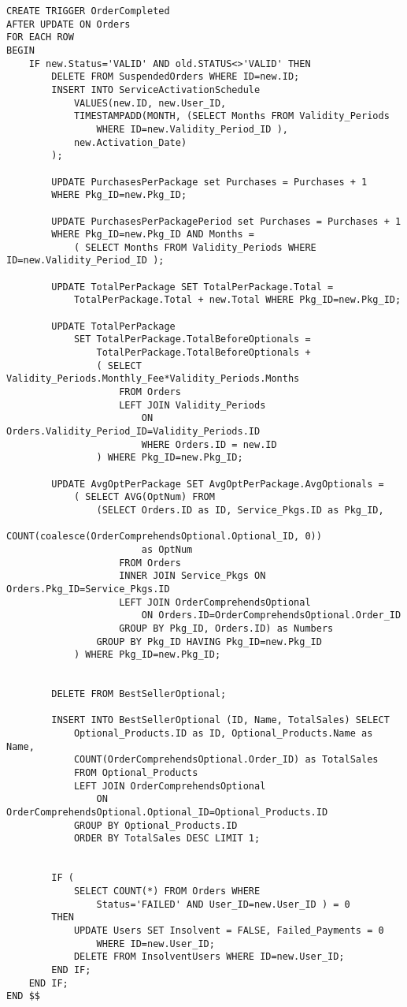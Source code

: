 \begin{lstlisting}[style=SQL]
CREATE TRIGGER OrderCompleted
AFTER UPDATE ON Orders
FOR EACH ROW
BEGIN
    IF new.Status='VALID' AND old.STATUS<>'VALID' THEN
        DELETE FROM SuspendedOrders WHERE ID=new.ID;
        INSERT INTO ServiceActivationSchedule
            VALUES(new.ID, new.User_ID,
            TIMESTAMPADD(MONTH, (SELECT Months FROM Validity_Periods
                WHERE ID=new.Validity_Period_ID ),
            new.Activation_Date)
        );

        UPDATE PurchasesPerPackage set Purchases = Purchases + 1
        WHERE Pkg_ID=new.Pkg_ID;

        UPDATE PurchasesPerPackagePeriod set Purchases = Purchases + 1
        WHERE Pkg_ID=new.Pkg_ID AND Months =
            ( SELECT Months FROM Validity_Periods WHERE ID=new.Validity_Period_ID );

        UPDATE TotalPerPackage SET TotalPerPackage.Total =
            TotalPerPackage.Total + new.Total WHERE Pkg_ID=new.Pkg_ID;

        UPDATE TotalPerPackage
            SET TotalPerPackage.TotalBeforeOptionals =
                TotalPerPackage.TotalBeforeOptionals +
                ( SELECT Validity_Periods.Monthly_Fee*Validity_Periods.Months
                    FROM Orders
                    LEFT JOIN Validity_Periods
                        ON Orders.Validity_Period_ID=Validity_Periods.ID
                        WHERE Orders.ID = new.ID
                ) WHERE Pkg_ID=new.Pkg_ID;

        UPDATE AvgOptPerPackage SET AvgOptPerPackage.AvgOptionals =
            ( SELECT AVG(OptNum) FROM
                (SELECT Orders.ID as ID, Service_Pkgs.ID as Pkg_ID,
                    COUNT(coalesce(OrderComprehendsOptional.Optional_ID, 0)) 
                        as OptNum
                    FROM Orders
                    INNER JOIN Service_Pkgs ON Orders.Pkg_ID=Service_Pkgs.ID
                    LEFT JOIN OrderComprehendsOptional
                        ON Orders.ID=OrderComprehendsOptional.Order_ID
                    GROUP BY Pkg_ID, Orders.ID) as Numbers
                GROUP BY Pkg_ID HAVING Pkg_ID=new.Pkg_ID
            ) WHERE Pkg_ID=new.Pkg_ID;


        DELETE FROM BestSellerOptional;

        INSERT INTO BestSellerOptional (ID, Name, TotalSales) SELECT
            Optional_Products.ID as ID, Optional_Products.Name as Name,
            COUNT(OrderComprehendsOptional.Order_ID) as TotalSales
            FROM Optional_Products
            LEFT JOIN OrderComprehendsOptional
                ON OrderComprehendsOptional.Optional_ID=Optional_Products.ID
            GROUP BY Optional_Products.ID
            ORDER BY TotalSales DESC LIMIT 1;


        IF (
            SELECT COUNT(*) FROM Orders WHERE
                Status='FAILED' AND User_ID=new.User_ID ) = 0
        THEN
            UPDATE Users SET Insolvent = FALSE, Failed_Payments = 0
                WHERE ID=new.User_ID;
            DELETE FROM InsolventUsers WHERE ID=new.User_ID;
        END IF;
    END IF;
END $$

\end{lstlisting}


